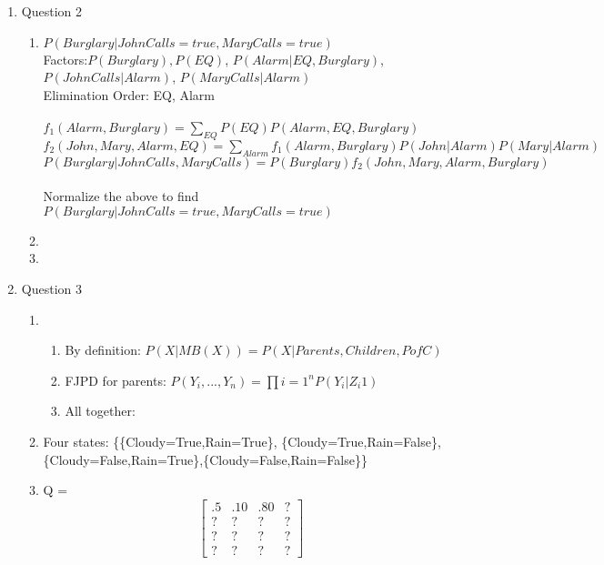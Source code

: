 \documentclass[11pt]{article}
\begin{document}
\begin{enumerate}
\begin{enumerate}
\end{enumerate}

\item Question 2
\begin{enumerate}
\item $P(Burglary|JohnCalls = true, MaryCalls = true)$
\\Factors:$ P(Burglary), P(EQ)$, $P(Alarm|EQ, Burglary)$,$ P(JohnCalls|Alarm)$, $P(MaryCalls|Alarm)$
\\Elimination Order: EQ, Alarm
\\
\\$f_{1}(Alarm, Burglary) = \sum_{EQ} P(EQ) P(Alarm, EQ, Burglary)$
\\$f_{2}(John, Mary, Alarm, EQ) = \sum_{Alarm}f_{1}(Alarm,Burglary)P(John|Alarm)P(Mary|Alarm)$
\\$P(Burglary|JohnCalls,MaryCalls) = P(Burglary)f_{2}(John, Mary, Alarm, Burglary)$
\\
\\Normalize the above to find $P(Burglary|JohnCalls = true, MaryCalls = true)$
\item
\item
\end {enumerate}

\item Question 3
\begin{enumerate}
\item
\begin{enumerate}
\item By definition: $P(X|MB(X)) = P(X|Parents,Children,PofC) $
\item FJPD for parents: $P(Y_i, ..., Y_n) = \prod{i = 1}^{n} P(Y_i | Z_{i}1)$ 
\item All together: 
\end{enumerate}
\item Four states: \{\{Cloudy=True,Rain=True\}, \{Cloudy=True,Rain=False\}, \\
 \{Cloudy=False,Rain=True\},\{Cloudy=False,Rain=False\}\}
\item Q = \[
\begin{bmatrix}
	.5 & .10 & .80 & ? \\
	? & ? & ? & ? \\
	? & ? & ? & ? \\
	? & ? & ? & ?
\end{bmatrix}
\]
\end{enumerate}


\end{enumerate}
\end{document}
